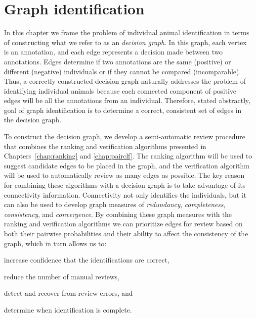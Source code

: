 \chapter{Graph identification}\label{chap:graphid}
\newcommand{\nT}{N}

In this chapter we frame the problem of individual animal identification in terms of constructing what we refer to
as an \emph{decision graph}. In this graph, each vertex is an annotation, and each edge represents a decision made
between two annotations.  Edges determine if two annotations are the same (positive) or different (negative)
individuals or if they cannot be compared (incomparable). Thus, a correctly constructed decision graph naturally
addresses the problem of identifying individual animals because each connected component of positive edges will be
all the annotations from an individual. Therefore, stated abstractly, goal of graph identification is to determine
a correct, consistent set of edges in the decision graph.

To construct the decision graph, we develop a semi-automatic review procedure that combines the ranking and
verification algorithms presented in Chapters~\ref{chap:ranking} and \ref{chap:pairclf}. The ranking algorithm will
be used to suggest candidate edges to be placed in the graph, and the verification algorithm will be used to
automatically review as many edges as possible.  The key reason for combining these algorithms with a decision
graph is to take advantage of its connectivity information.  Connectivity not only identifies the individuals, but
it can also be used to develop graph measures of \emph{redundancy}, \emph{completeness}, \emph{consistency}, and
\emph{convergence}.  By combining these graph measures with the ranking and verification algorithms we can
prioritize edges for review based on both their pairwise probabilities and their ability to affect the consistency
of the graph, which in turn allows us to:
\begin{enumin}
\item increase confidence that the identifications are correct, %
\item reduce the number of manual reviews,  %
\item detect and recover from review errors, and %
\item determine when identification is complete. %
\end{enumin}

